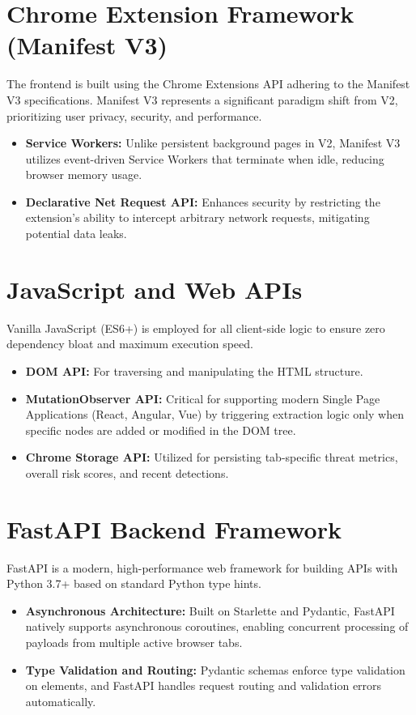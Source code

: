 \documentclass[12pt,a4paper]{report}
\begin{document}
\section{Chrome Extension Framework (Manifest V3)}
The frontend is built using the Chrome Extensions API adhering to the Manifest V3 specifications. Manifest V3 represents a significant paradigm shift from V2, prioritizing user privacy, security, and performance. 
\begin{itemize}
    \item \textbf{Service Workers:} Unlike persistent background pages in V2, Manifest V3 utilizes event-driven Service Workers that terminate when idle, reducing browser memory usage.
    \item \textbf{Declarative Net Request API:} Enhances security by restricting the extension's ability to intercept arbitrary network requests, mitigating potential data leaks.
\end{itemize}

\section{JavaScript and Web APIs}
Vanilla JavaScript (ES6+) is employed for all client-side logic to ensure zero dependency bloat and maximum execution speed. 
\begin{itemize}
    \item \textbf{DOM API:} For traversing and manipulating the HTML structure.
    \item \textbf{MutationObserver API:} Critical for supporting modern Single Page Applications (React, Angular, Vue) by triggering extraction logic only when specific nodes are added or modified in the DOM tree.
    \item \textbf{Chrome Storage API:} Utilized for persisting tab-specific threat metrics, overall risk scores, and recent detections.
\end{itemize}

\section{FastAPI Backend Framework}
FastAPI is a modern, high-performance web framework for building APIs with Python 3.7+ based on standard Python type hints.
\begin{itemize}
    \item \textbf{Asynchronous Architecture:} Built on Starlette and Pydantic, FastAPI natively supports asynchronous coroutines, enabling concurrent processing of payloads from multiple active browser tabs.
    \item \textbf{Type Validation and Routing:} Pydantic schemas enforce type validation on elements, and FastAPI handles request routing and validation errors automatically.
\end{itemize}
\end{document}
